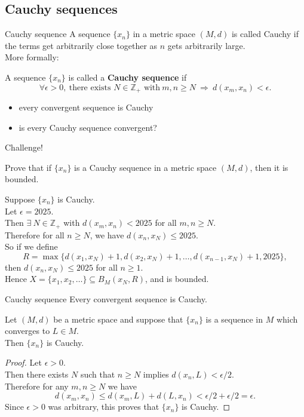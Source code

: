 \documentclass{beamer}
\begin{document}
\subsection{Cauchy sequences}

\begin{frame}{Cauchy sequence}
A sequence $\{x_n\}$ in a metric space $(M,d)$ is called Cauchy if the terms get arbitrarily close together as $n$ gets arbitrarily large.\\
\pause
More formally:
\pause
\begin{defn}
A sequence $\{x_n\}$ is called a \textbf{Cauchy sequence} if
$$\forall \epsilon > 0,\ \text{there exists $N\in\mathbb Z_{+}$ with}\ m,n\geq N\ \Rightarrow\ d(x_m,x_n) < \epsilon.$$
\end{defn}
\begin{itemize}
\pause
\item every convergent sequence is Cauchy
\pause
\item is every Cauchy sequence convergent?
\end{itemize}
\end{frame}

\begin{frame}{Challenge!}
\begin{prob}
Prove that if $\{x_n\}$ is a Cauchy sequence in a metric space $(M,d)$, then it is bounded.
\end{prob}
\pause
\begin{soln}
\pause
Suppose $\{x_n\}$ is Cauchy.\\
\pause
Let $\epsilon = 2025$.\\
\pause
Then $\exists\ N\in\mathbb{Z}_+$ with $d(x_m,x_n) < 2025$ for all $m,n\geq N$.\\
\pause
Therefore for all $n\geq N$, we have $d(x_n,x_N)\leq 2025$.\\
\pause
So if we define
$$R = \max\{d(x_1,x_N)+1, d(x_2,x_N)+1,\dots, d(x_{n-1},x_N)+1,2025\},$$
\pause
then $d(x_n,x_N)\leq 2025$ for all $n\geq 1$.\\
\pause
Hence $X = \{x_1,x_2,\dots\}\subseteq B_M(x_N,R)$, and is bounded.
\end{soln}
\end{frame}

\begin{frame}{Cauchy sequence}
Every convergent sequence is Cauchy.
\pause
\begin{thm}
Let $(M,d)$ be a metric space and suppose that $\{x_n\}$ is a sequence in $M$ which converges to $L\in M$.\\
Then $\{x_n\}$ is Cauchy.
\end{thm}
\pause
\begin{proof}
\pause
Let $\epsilon > 0$.\\
\pause
Then there exists $N$ such that $n\geq N$ implies $d(x_n,L) < \epsilon/2$.\\
\pause
Therefore for any $m,n\geq N$ we have
$$d(x_m,x_n)\leq d(x_m,L) + d(L,x_n) < \epsilon/2 + \epsilon/2 = \epsilon.$$
Since $\epsilon > 0$ was arbitrary, this proves that $\{x_n\}$ is Cauchy.
\end{proof}
\end{frame}
\end{document}
